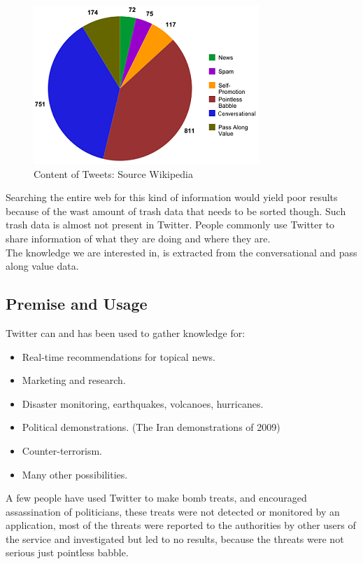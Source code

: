 \documentclass[]{article}  %
\begin{document}
\begin{figure}[h]
\centering
\includegraphics[scale=1]{Content_of_Tweets_Graphed.png}
\caption{Content of Tweets: Source Wikipedia}
\label{figContent}
\end{figure} 
Searching the entire web for this kind of information would yield poor results because of the wast amount of trash data that needs to be sorted though. Such trash data is almost not present in Twitter. People commonly use Twitter to share information of what they are doing and where they are. \\ The knowledge we are interested in, is extracted from the conversational and pass along value data.

\subsection{Premise and Usage}
Twitter can and has been used to gather knowledge for:

\begin{itemize}
	\item Real-time recommendations for topical news. \cite{bib5}
	\item Marketing and research.
	\item Disaster monitoring, earthquakes, volcanoes, hurricanes. \cite{bib7}
	\item Political demonstrations. (The Iran demonstrations of 2009)
	\item Counter-terrorism.
	\item Many other possibilities.
\end{itemize}

A few people have used Twitter to make bomb treats, and encouraged assassination of politicians, these treats were not detected or monitored by an application, most of the threats were reported to the authorities by other users of the service and investigated but led to no results, because the threats were not serious just pointless babble.
\end{document}
